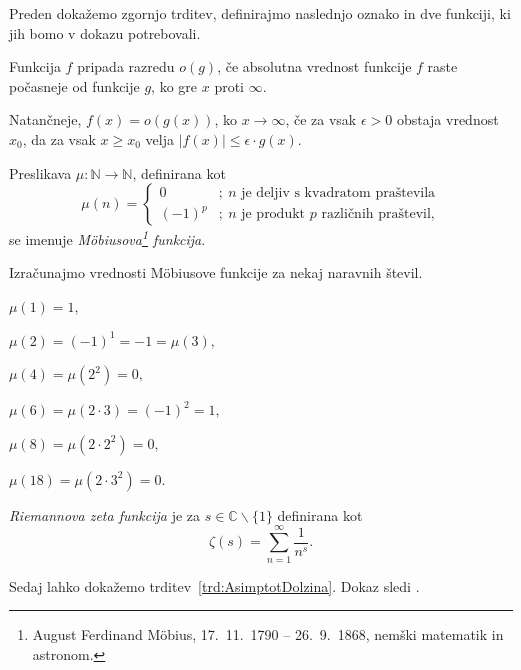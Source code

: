 \documentclass[mat1]{fmfdelo}
\begin{document}
%
Preden dokažemo zgornjo trditev, definirajmo naslednjo oznako in dve funkciji, ki jih bomo v dokazu potrebovali.

\begin{definicija}
Funkcija $f$ pripada razredu $o(g)$, če absolutna vrednost funkcije $f$ raste počasneje od funkcije $g$, ko gre $x$ proti $\infty$.

Natančneje, $f(x) = o \left(g(x) \right)$, ko $x \to \infty$, če za vsak $\epsilon>0$ obstaja vrednost $x_{0}$, da za vsak $x \geq x_{0}$ velja $|f(x)| \leq \epsilon \cdot g(x)$.
\end{definicija}

\begin{definicija}
\label{def:MobFun}
Preslikava \( \mu\colon \mathbb{N} \to \mathbb{N} \), definirana kot
\[
\mu(n) = \left\{
\begin{array}{rl}
0 & ;\ \mbox{$n$ je deljiv s kvadratom praštevila}\\
(-1)^p & ;\  \mbox{$n$ je produkt $p$ različnih praštevil,}
\end{array}
\right.
\]
se imenuje \emph{M\"obiusova\footnote{August Ferdinand M\"obius, 17.\ 11.\ 1790 -- 26.\ 9.\ 1868, nemški matematik in astronom.} funkcija}.
\end{definicija}

\begin{primer}
Izračunajmo vrednosti M\"obiusove funkcije za nekaj naravnih števil.

\( \mu(1)=1, \)

\( \mu(2)=(-1)^{1}=-1=\mu(3), \)

\( \mu(4)=\mu(2^{2})=0, \)

\( \mu(6)=\mu(2\cdot3)=(-1)^{2}=1, \)

\( \mu(8)=\mu(2\cdot2^{2})=0, \)

\( \mu(18)=\mu(2\cdot3^{2})=0. \)
\end{primer}

\begin{definicija}
\label{def:RiemZeta}
\emph{Riemannova zeta funkcija} je za
 $s\in\mathbb{C}\backslash\{1\}$
definirana kot
\[ \zeta(s) = \sum_{n=1}^{\infty}\frac{1}{n^s}. \]
\end{definicija}

%
Sedaj lahko dokažemo trditev~\ref{trd:AsimptotDolzina}. Dokaz sledi \cite[poglavje 18.5, str.~268]{hardy}.
\end{document}
